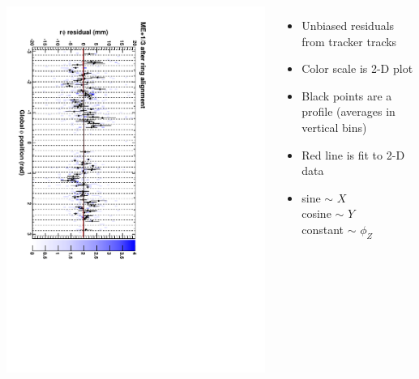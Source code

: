 \documentclass[compress]{beamer}
\begin{document}
\begin{frame}
\begin{columns}
\includegraphics[height=\linewidth, angle=90]{ringfits_after/mep13.pdf}
\begin{itemize}
\item Unbiased residuals from tracker tracks
\item Color scale is 2-D plot
\item Black points are a profile (averages in vertical bins)
\item Red line is fit to 2-D data
\item sine $\sim$ $X$ \\
cosine $\sim$ $Y$ \\
constant $\sim$ $\phi_Z$
\end{itemize}
\end{columns}
\end{frame}
\end{document}
